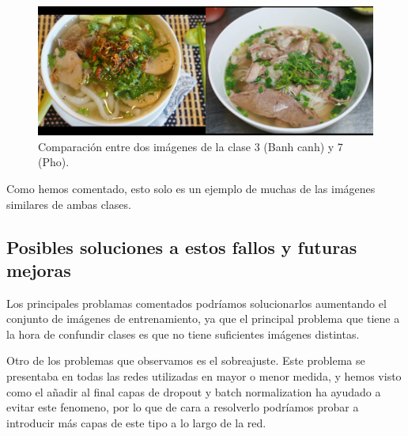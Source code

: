 \begin{figure}[H]
  \centering
  \includegraphics[width=1\linewidth]{Imagenes/cmp-c7-c3.png}
  \caption{Comparación entre dos imágenes de la clase 3 (Banh canh) y 7 (Pho).}
\end{figure}


Como hemos comentado, esto solo es un ejemplo de muchas de las imágenes similares de ambas clases.

\subsection{Posibles soluciones a estos fallos y futuras mejoras}

Los principales problamas comentados podríamos solucionarlos aumentando el conjunto de imágenes de entrenamiento, ya que el principal problema que tiene a la hora de confundir clases es que no tiene suficientes imágenes distintas.

Otro de los problemas que observamos es el sobreajuste. Este problema se presentaba en todas las redes utilizadas en mayor o menor medida, y hemos visto como el añadir al final capas de dropout y batch normalization ha ayudado a evitar este fenomeno, por lo que de cara a resolverlo podríamos probar a introducir más capas de este tipo a lo largo de la red.
